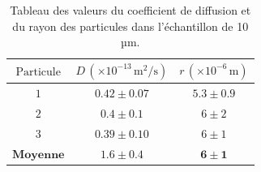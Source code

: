 \documentclass[11pt,letterpaper]{article}
\begin{document}
\begin{table}[H]
  \centering
  \caption{Tableau des valeurs du coefficient de diffusion et du rayon des particules dans l'échantillon de 10 µm.}
  \begin{tabular}{|c|c|c|}
  \hline
  \( \text{Particule} \) &\( D \, (\times 10^{-13} \, \text{m}^2/\text{s}) \) & \( r \, (\times 10^{-6} \, \text{m}) \) \\
  \hline
  \( 1 \) &\( 0.42 \pm 0.07 \) & \( 5.3 \pm 0.9 \) \\
  \( 2 \) &\( 0.4 \pm 0.1 \) & \( 6 \pm 2 \) \\
  \( 3 \) &\( 0.39 \pm 0.10 \) & \( 6 \pm 1 \) \\
  \hline
  \hline
  \( \textbf{Moyenne} \) & \( \mathbf{1.6 \pm 0.4} \) & \( \mathbf{6 \pm 1} \) \\
  \hline
  \end{tabular}
\end{table}
\end{document}

